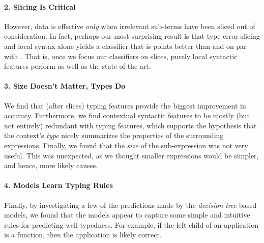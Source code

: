 \paragraph{2. Slicing Is Critical}
%
However, data is effective \emph{only}
when irrelevant sub-terms have been
sliced out of consideration.
%
In fact, perhaps our most surprising
result is that type error slicing and
local syntax alone yields
a classifier that is \SlicingWinOcaml points
better than \ocaml and on par with
\sherrloc.
%
That is, once we focus our classifiers on
slices, purely local syntactic features
perform as well as the
state-of-the-art.

\paragraph{3. Size Doesn't Matter, Types Do}
%
We find that (after slices)
typing features
provide the biggest
improvement in accuracy.
%
Furthermore, we find contextual syntactic
features to be mostly (but not entirely)
redundant with typing features,
which supports the hypothesis that
the context's \emph{type} nicely
summarizes the properties of the
surrounding expressions.
%
Finally, we found that the \emph{size}
of the sub-expression was not very useful.
This was unexpected, as we thought
smaller expressions would be simpler, and
hence, more likely causes.

\paragraph{4. Models Learn Typing Rules}
%
Finally, by investigating a few of the
predictions made by the \emph{decision tree}-based
models, we found that the models
appear to capture some simple and intuitive
rules for predicting well-typedness.
%
For example, if the left child of an application
is a function, then the application is likely
correct.

%


